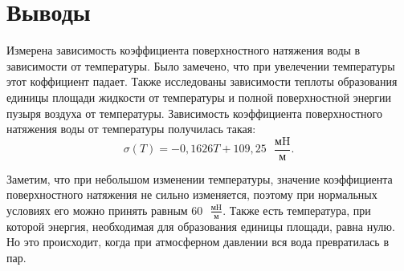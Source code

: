 \section{Выводы}

Измерена зависимость коэффициента поверхностного натяжения воды в зависимости от температуры. Было замечено, что при увелечении температуры этот коффициент падает. Также исследованы зависимости теплоты образования единицы площади жидкости от температуры и полной поверхностной энергии пузыря воздуха от температуры. Зависимость коэффициента поверхностного натяжения воды от температуры получилась такая:
\[\sigma(T) = -0,1626T + 109,25 \text{ }\frac{\text{мH}}{\text{м}}.\]

Заметим, что при небольшом изменении температуры, значение коэффициента поверхностного натяжения не сильно изменяется, поэтому при нормальных условиях его можно принять равным $60 \text{ }\frac{\text{мH}}{\text{м}}$. Также есть температура, при которой энергия, необходимая для образования единицы площади, равна нулю. Но это происходит, когда при атмосферном давлении вся вода превратилась в пар.
